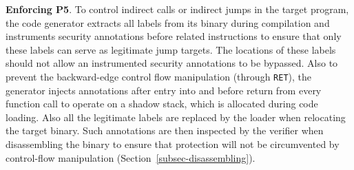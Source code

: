 \vspace{3pt}\noindent\textbf{Enforcing P5}. To control indirect calls or indirect jumps in the target program, the code generator extracts all labels from its binary during compilation and instruments security annotations before related instructions to ensure that only these labels can serve as legitimate jump targets. The locations of these labels should not allow an instrumented security annotations to be bypassed. 
Also to prevent the backward-edge control flow manipulation (through \texttt{RET}), the generator injects annotations after entry into and before return from every function call to operate on a shadow stack, which is allocated during code loading. Also all the legitimate labels are replaced by the loader when relocating the target binary. Such annotations are then inspected by the verifier when disassembling the binary to ensure that protection will not be circumvented by control-flow manipulation (Section~\ref{subsec-disassembling}).  















